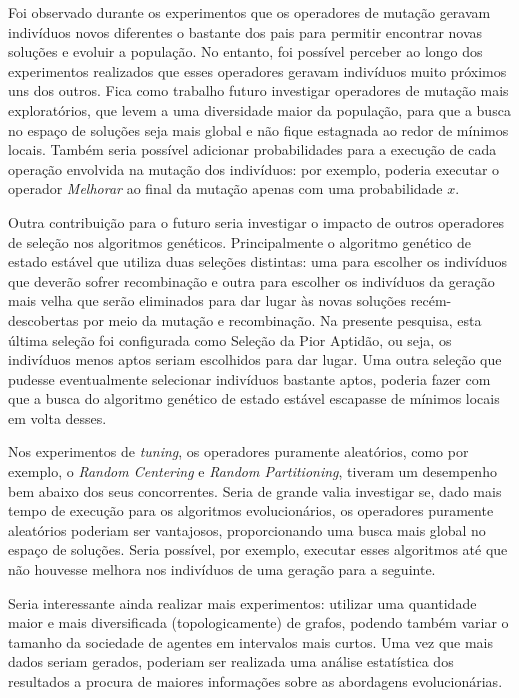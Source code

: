 Foi observado durante os experimentos que os operadores de mutação geravam 
indivíduos novos diferentes o bastante dos pais para permitir encontrar novas 
soluções e evoluir a população. No entanto, foi possível perceber ao longo dos 
experimentos realizados que esses operadores geravam indivíduos muito próximos 
uns dos outros. Fica como trabalho futuro investigar operadores de mutação mais 
exploratórios, que levem a uma diversidade maior da população, para que a busca 
no espaço de soluções seja mais global e não fique estagnada ao redor de mínimos 
locais. Também seria possível adicionar probabilidades para a execução de cada 
operação envolvida na mutação dos indivíduos: por exemplo, poderia executar o 
operador \textit{Melhorar} ao final da mutação apenas com uma probabilidade $x$.

Outra contribuição para o futuro seria investigar o impacto de outros operadores 
de seleção nos algoritmos genéticos. Principalmente o algoritmo genético de 
estado estável que utiliza duas seleções distintas: uma para escolher os 
indivíduos que deverão sofrer recombinação e outra para escolher os indivíduos 
da geração mais velha que serão eliminados para dar lugar às novas soluções 
recém-descobertas por meio da mutação e recombinação. Na presente pesquisa, 
esta última seleção foi configurada como Seleção da Pior Aptidão, ou seja, os 
indivíduos menos aptos seriam escolhidos para dar lugar. Uma outra seleção 
que pudesse eventualmente selecionar indivíduos bastante aptos, poderia fazer 
com que a busca do algoritmo genético de estado estável escapasse de mínimos 
locais em volta desses.

Nos experimentos de \textit{tuning}, os operadores puramente aleatórios, como 
por exemplo, o \textit{Random Centering} e \textit{Random Partitioning}, tiveram 
um desempenho bem abaixo dos seus concorrentes. Seria de grande valia investigar 
se, dado mais tempo de execução para os algoritmos evolucionários, os operadores 
puramente aleatórios poderiam ser vantajosos, proporcionando uma busca mais 
global no espaço de soluções. Seria possível, por exemplo, executar esses 
algoritmos até que não houvesse melhora nos indivíduos de uma geração para a 
seguinte.

Seria interessante ainda realizar mais experimentos: utilizar uma quantidade 
maior e mais diversificada (topologicamente) de grafos, podendo também variar 
o tamanho da sociedade de agentes em intervalos mais curtos. Uma vez que mais 
dados seriam gerados, poderiam ser realizada uma análise estatística dos 
resultados a procura de maiores informações sobre as abordagens evolucionárias.